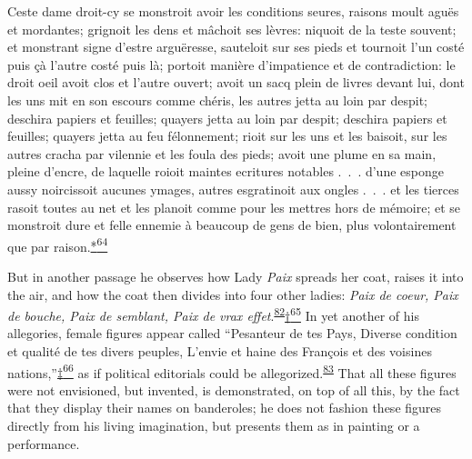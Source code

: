 Ceste dame droit-cy se monstroit avoir les conditions seures, raisons
moult aguës et mordantes; grignoit les dens et mâchoit ses lèvres:
niquoit de la teste souvent; et monstrant signe d'estre arguëresse,
sauteloit sur ses pieds et tournoit l'un costé puis çà l'autre costé
puis là; portoit manière d'impatience et de contradiction: le droit oeil
avoit clos et l'autre ouvert; avoit un sacq plein de livres devant lui,
dont les uns mit en son escours comme chéris, les autres jetta au loin
par despit; deschira papiers et feuilles; quayers jetta au loin par
despit; deschira papiers et feuilles; quayers jetta au feu félonnement;
rioit sur les uns et les baisoit, sur les autres cracha par vilennie et
les foula des pieds; avoit une plume en sa main, pleine d'encre, de
laquelle roioit maintes ecritures notables .~.~. d'une esponge aussy
noircissoit aucunes ymages, autres esgratinoit aux ongles .~.~. et les
tierces
\protect\hypertarget{21_Chapter_Thirteen__IMAGE_AND_WORD.xhtmlux5cux23page_378}{}{}rasoit
toutes au net et les planoit comme pour les mettres hors de mémoire; et
se monstroit dure et felle ennemie à beaucoup de gens de bien, plus
volontairement que par
raison.\protect\hypertarget{21_Chapter_Thirteen__IMAGE_AND_WORD.xhtmlux5cux23id_2825}{\protect\hyperlink{23_NOTES.xhtmlux5cux23id_2826}{*\textsuperscript{64}}}

But in another passage he observes how Lady \emph{Paix} spreads her
coat, raises it into the air, and how the coat then divides into four
other ladies: \emph{Paix de coeur, Paix de bouche, Paix de semblant,
Paix de vrax
effet}.\textsuperscript{\protect\hypertarget{21_Chapter_Thirteen__IMAGE_AND_WORD.xhtmlux5cux23id_148}{\protect\hyperlink{23_NOTES.xhtmlux5cux23id_149}{82}}}\protect\hypertarget{21_Chapter_Thirteen__IMAGE_AND_WORD.xhtmlux5cux23id_2823}{\protect\hyperlink{23_NOTES.xhtmlux5cux23id_2824}{†\textsuperscript{65}}}
In yet another of his allegories, female figures appear called
``Pesanteur de tes Pays, Diverse condition et qualité de tes divers
peuples, L'envie et haine des François et des voisines
nations,''\protect\hypertarget{21_Chapter_Thirteen__IMAGE_AND_WORD.xhtmlux5cux23id_2821}{\protect\hyperlink{23_NOTES.xhtmlux5cux23id_2822}{‡\textsuperscript{66}}}
as if political editorials could be
allegorized.\textsuperscript{\protect\hypertarget{21_Chapter_Thirteen__IMAGE_AND_WORD.xhtmlux5cux23id_146}{\protect\hyperlink{23_NOTES.xhtmlux5cux23id_147}{83}}}
That all these figures were not envisioned, but invented, is
demonstrated, on top of all this, by the fact that they display their
names on banderoles; he does not fashion these figures directly from his
living imagination, but presents them as in painting or a performance.

